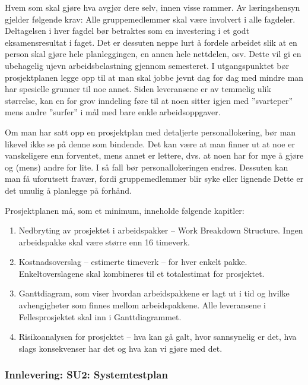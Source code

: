 Hvem som skal gjøre hva avgjør dere selv, innen visse rammer. Av læringshensyn gjelder følgende krav: Alle gruppemedlemmer skal være involvert i alle fagdeler. Deltagelsen i hver fagdel bør betraktes som en investering i et godt eksamensresultat i faget. Det er dessuten neppe lurt å fordele arbeidet slik at en person skal gjøre hele planleggingen, en annen hele nettdelen, osv. Dette vil gi en ubehagelig ujevn arbeidsbelastning gjennom semesteret. I utgangspunktet bør prosjektplanen legge opp til at man skal jobbe jevnt dag for dag med mindre man har spesielle grunner til noe annet. Siden leveransene er av temmelig ulik størrelse, kan en for grov inndeling føre til at noen sitter igjen med ”svarteper” mens andre ”surfer” i mål med bare enkle arbeidsoppgaver.

Om man har satt opp en prosjektplan med detaljerte personallokering, bør man likevel ikke se på denne som bindende. Det kan være at man finner ut at noe er vanskeligere enn forventet, mens annet er lettere, dvs. at noen har for mye å gjøre og (mens) andre for lite. I så fall bør personallokeringen endres. Dessuten kan man få uforutsett fravær, fordi gruppemedlemmer blir syke eller lignende Dette er det umulig å planlegge på forhånd.

Prosjektplanen må, som et minimum, inneholde følgende kapitler:

\begin{enumerate}

\item
Nedbryting av prosjektet i arbeidspakker – Work Breakdown Structure. Ingen arbeidspakke skal være større enn 16 timeverk.

\item
Kostnadsoverslag – estimerte timeverk – for hver enkelt pakke. Enkeltoverslagene skal kombineres til et totalestimat for prosjektet.

\item
Ganttdiagram, som viser hvordan arbeidspakkene er lagt ut i tid og hvilke avhengigheter som finnes mellom arbeidspakkene. Alle leveransene i Fellesprosjektet skal inn i Ganttdiagrammet. 

\item
Risikoanalysen for prosjektet – hva kan gå galt, hvor sannsynelig er det, hva slags konsekvenser har det og hva kan vi gjøre med det.

\end{enumerate}

\subsubsection{Innlevering: SU2: Systemtestplan}

